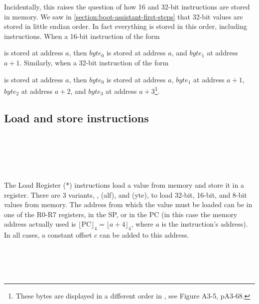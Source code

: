 Incidentally, this raises the question of how 16 and 32-bit instructions are
stored in memory. We saw in \cref{section:boot-assistant-first-steps} that
32-bit values are stored in little endian order. In fact everything is stored
in this order, including instructions. When a 16-bit instruction of the form

\vspace{1pt}
\noindent\hfill{}
\vspace{3pt}

\noindent is stored at address $a$, then $byte_0$ is stored at address $a$, and
$byte_1$ at address $a+1$. Similarly, when a 32-bit instruction of the form

\vspace{1pt}
\noindent\hfill{}
\vspace{3pt}

\noindent is stored at address $a$, then $byte_0$ is stored at address $a$,
$byte_1$ at address $a+1$, $byte_2$ at address $a+2$, and $byte_3$ at address
$a+3$\footnote{These bytes are displayed in a different order in \cite{ARMv7},
see Figure A3-5, pA3-68.}.

\subsection{Load and store instructions}\label{subsection:load-store-insns}

\begin{Paragraph}[]
\\
\\
\\
\\
\end{Paragraph}

The Load Register (*) instructions load a value from memory and store
it in a register. There are 3 variants, , (alf), and
(yte), to load 32-bit, 16-bit, and 8-bit values from memory. The
address from which the value must be loaded can be in one of the R0-R7
registers, in the SP, or in the PC (in this case the memory address actually
used is $\lfloor \mathrm{PC} \rfloor_4 = \lfloor a+4 \rfloor_4$, where $a$ is
the instruction's address). In all cases, a constant offset $c$ can be added to
this address.

\begin{Paragraph}
\\
\\
\\
\end{Paragraph}


